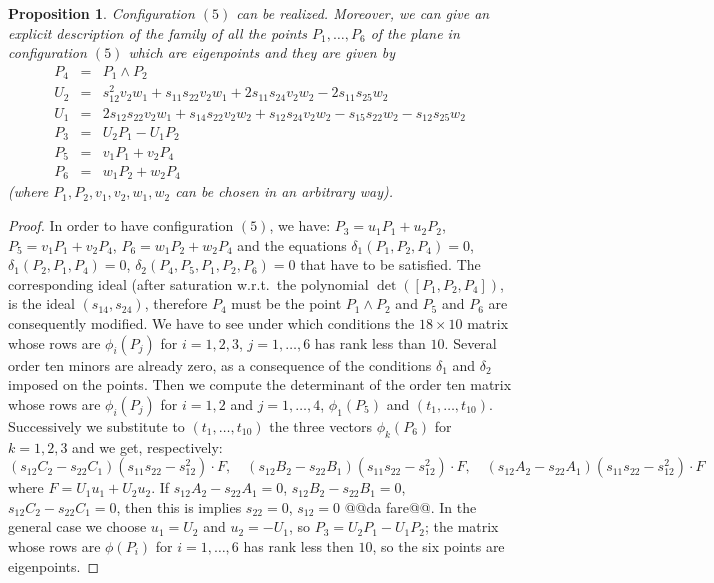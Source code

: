 \documentclass{amsart}
\theoremstyle{plain}
\newtheorem{prop}[theorem]{Proposition}
\theoremstyle{definition}
\begin{document}
\begin{prop}
  Configuration $(5)$ can be realized. Moreover, we can give an explicit
  description
  of the family of all the points $P_1, \dots, P_6$ of the plane in
  configuration $(5)$ which
  are eigenpoints and they are given by
  \[
  \begin{array}{rcl}
    P_4 &=& P_1 \wedge P_2\\
    U_2 &=& s_{12}^2v_2w_1 + s_{11}s_{22}v_2w_1 + 2s_{11}s_{24}v_2w_2
    - 2s_{11}s_{25}w_2\\    
    U_1 &=& 2s_{12}s_{22}v_2w_1 + s_{14}s_{22}v_2w_2 + s_{12}s_{24}v_2w_2
    - s_{15}s_{22}w_2 - s_{12}s_{25}w_2\\
    P_3 &=& U_2P_1 - U_1P_2\\
    P_5 &=& v_1P_1+v_2P_4 \\
    P_6 &=& w_1P_2+w_2P_4
  \end{array}
  \]
  (where $P_1, P_2, v_1, v_2, w_1, w_2$ can be chosen in an arbitrary way). 
\end{prop}
\begin{proof}
  In order to have configuration $(5)$, we have:
  $P_3 = u_1P_1+u_2P_2$, $P_5 = v_1P_1+v_2P_4$, $P_6 = w_1P_2+w_2P_4$ and
  the equations $\delta_1(P_1, P_2, P_4) = 0$, $\delta_1(P_2, P_1, P_4) = 0$,
  $\delta_2(P_4, P_5, P_1, P_2, P_6) = 0$ that have to be satisfied.
  The corresponding ideal (after
  saturation w.r.t.\ the polynomial $\det([P_1, P_2, P_4])$, is
  the ideal $(s_{14}, s_{24})$, therefore $P_4$ must be the point
  $P_1 \wedge P_2$ and $P_5$ and $P_6$ are consequently modified.
  We have to see under which conditions the $18\times 10$ matrix
  whose rows are $\phi_i(P_j)$ for $i=1, 2, 3$, $j=1, \dots, 6$ has
  rank less than $10$. Several order ten minors are already zero, as
  a consequence of the conditions $\delta_1$ and $\delta_2$ imposed on
  the points.
  Then we
  compute the determinant of the order ten matrix whose rows are
  $\phi_i(P_j)$ for $i=1, 2$ and
  $j = 1, \dots, 4$, $\phi_1(P_5)$ and $(t_1, \dots, t_{10})$.
  Successively we substitute
  to $(t_1, \dots, t_{10})$ the three vectors $\phi_k(P_6)$ for $k=1, 2, 3$
  and we get, respectively:
  \[(s_{12}C_2-s_{22}C_1)(s_{11}s_{22}-s_{12}^2)\cdot F, \quad
  (s_{12}B_2-s_{22}B_1)(s_{11}s_{22}-s_{12}^2)\cdot F,\quad
  (s_{12}A_2-s_{22}A_1)(s_{11}s_{22}-s_{12}^2)\cdot F
  \]
  where $F = U_1u_1+U_2u_2$.
  If $s_{12}A_2-s_{22}A_1=0$, $s_{12}B_2-s_{22}B_1=0$, $s_{12}C_2-s_{22}C_1=0$,
  then this is implies $s_{22}=0$, $s_{12} = 0$ @@da fare@@. In the general case
  we choose $u_1 = U_2$ and $u_2 = -U_1$, so $P_3=U_2P_1 - U_1P_2$;
  the matrix whose rows are $\phi(P_i)$ for $i=1, \dots, 6$ has rank
  less then $10$, so the six points are eigenpoints.
  \end{proof}
\end{document}
